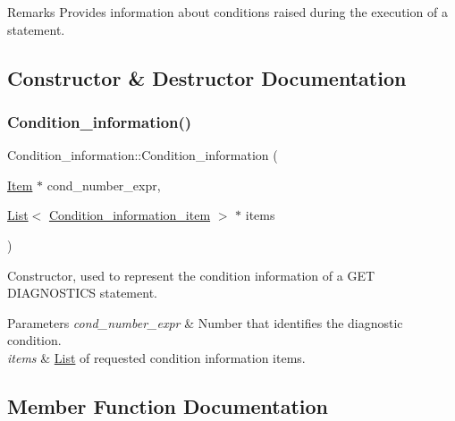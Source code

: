 \begin{DoxyRemark}{Remarks}
Provides information about conditions raised during the execution of a statement. 
\end{DoxyRemark}


\subsection{Constructor \& Destructor Documentation}
\mbox{\label{classCondition__information_a5e3aea823731ffd6403d6279c45b6d04}} 
\subsubsection{\texorpdfstring{Condition\+\_\+information()}{Condition\_information()}}
{\footnotesize\ttfamily Condition\+\_\+information\+::\+Condition\+\_\+information (\begin{DoxyParamCaption}\item[{\mbox{\hyperlink{classItem}{Item}} $\ast$}]{cond\+\_\+number\+\_\+expr,  }\item[{\mbox{\hyperlink{classList}{List}}$<$ \mbox{\hyperlink{classCondition__information__item}{Condition\+\_\+information\+\_\+item}} $>$ $\ast$}]{items }\end{DoxyParamCaption})\hspace{0.3cm}{\ttfamily [inline]}}

Constructor, used to represent the condition information of a G\+ET D\+I\+A\+G\+N\+O\+S\+T\+I\+CS statement.


\begin{DoxyParams}{Parameters}
{\em cond\+\_\+number\+\_\+expr} & Number that identifies the diagnostic condition. \\
\hline
{\em items} & \mbox{\hyperlink{classList}{List}} of requested condition information items. \\
\hline
\end{DoxyParams}


\subsection{Member Function Documentation}
\mbox{\label{classCondition__information_acb021776f86470bf0ca0da8a3f60c44a}} 
